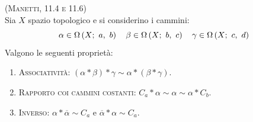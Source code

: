 \begin{proposition}\textsc{(Manetti, 11.4 e 11.6)\label{propcammini}}\\
	Sia $X$ spazio topologico e si considerino i cammini:
	\begin{equation*}
	\alpha\in\Omega\left(X;\ a,\ b\right)\quad\beta\in\Omega\left(X;\ b,\ c\right)\quad\gamma\in\Omega\left(X;\ c,\ d\right)
	\end{equation*}
Valgono le seguenti proprietà:
\begin{enumerate}
	\item \textsc{Associatività}: $\left(\alpha\ast\beta\right)\ast \gamma \sim \alpha\ast\left(\beta\ast\gamma\right)$.
	\item \textsc{Rapporto coi cammini costanti}: $C_a\ast \alpha \sim \alpha \sim \alpha \ast C_b$. 
	\item \textsc{Inverso}: $\alpha\ast\overline{\alpha}\sim C_a$ e $\overline{\alpha}\ast\alpha\sim C_a$.
\end{enumerate}
\vspace{-3mm}
\end{proposition}
